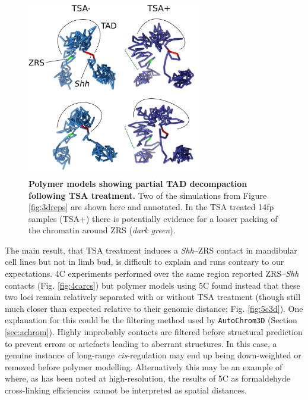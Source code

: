 \documentclass[a4paper,11pt,oneside]{book}
\begin{document}
\begin{figure}
\begin{center} 
\includegraphics[width=3in]{figs/decompaction.pdf}
\captionsetup{width=\textwidth} 
\caption[ Polymer models showing partial TAD decompaction following TSA treatment. ]{ {\bf Polymer models showing partial TAD decompaction following TSA treatment. }
Two of the simulations from Figure \ref{fig:3dreps} are shown here and annotated. In the TSA treated 14fp samples (TSA+) there is potentially evidence for a looser packing of the chromatin around ZRS (\emph{dark green}).
}\label{fig:decompaction}
\end{center} 
\end{figure} 


The main result, that TSA treatment induces a \emph{Shh}--ZRS contact in mandibular cell lines but not in limb bud, is difficult to explain and runs contrary to our expectations. 4C experiments performed over the same region reported ZRS--\emph{Shh} contacts (Fig. \ref{fig:4carcs}) but polymer models using 5C found instead that these two loci remain relatively separated with or without TSA treatment (though still much closer than expected relative to their genomic distance; Fig. \ref{fig:5c3d}). One explanation for this could be the filtering method used by \texttt{AutoChrom3D} (Section \ref{sec:achrom}). Highly improbably contacts are filtered before structural prediction to prevent errors or artefacts leading to aberrant structures. In this case, a genuine instance of long-range \emph{cis}-regulation may end up being down-weighted or removed before polymer modelling. Alternatively this may be an example of where, as has been noted at high-resolution, the results of 5C as formaldehyde cross-linking efficiencies cannot be interpreted as spatial distances.\cite{Williamson2014}
\end{document}
